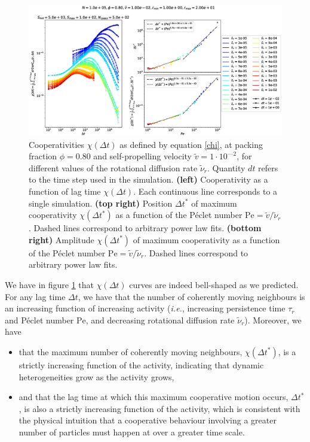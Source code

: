 \documentclass[class=report, float=false, crop=false]{standalone}
\begin{document}
\begin{figure}[h!]
\centering
\includegraphics[width=\textwidth]{figures/figs/intCuu_dt_Dk8000_Vj1000_Nq1000_Io5000_Mn1000_Cn5000_RMINl1000_RMAXm2000.eps}
\caption{Cooperativities $\chi(\Delta t)$ as defined by equation \ref{chi}, at packing fraction $\phi = 0.80$ and self-propelling velocity $\tilde{v} = 1\cdot10^{—2}$, for different values of the rotational diffusion rate $\tilde{\nu}_r$. Quantity $dt$ refers to the time step used in the simulation. \textbf{(left)} Cooperativity as a function of lag time $\chi(\Delta t)$. Each continuous line corresponds to a single simulation. \textbf{(top right)} Position $\Delta t^*$ of maximum cooperativity $\chi(\Delta t^*)$ as a function of the P\'eclet number $\text{Pe} = \tilde{v}/\tilde{\nu}_r$. Dashed lines correspond to arbitrary power law fits. \textbf{(bottom right)} Amplitude $\chi(\Delta t^*)$ of maximum cooperativity as a function of the P\'eclet number $\text{Pe} = \tilde{v}/\tilde{\nu}_r$. Dashed lines correspond to arbitrary power law fits.}
\label{chi_dr_dt}
\end{figure}

We have in figure \ref{chi_dr_dt} that $\chi(\Delta t)$ curves are indeed bell-shaped as we predicted.\\

For any lag time $\Delta t$, we have that the number of coherently moving neighbours is an increasing function of increasing activity (\textit{i.e.}, increasing persistence time $\tau_r$ and P\'eclet number $\text{Pe}$, and decreasing rotational diffusion rate $\tilde{\nu}_r$). Moreover, we have
\begin{itemize}
  \item that the maximum number of coherently moving neighbours, $\chi(\Delta t^*)$, is a strictly increasing function of the activity, indicating that dynamic heterogeneities grow as the activity grows,
  \item and that the lag time at which this maximum cooperative motion occurs, $\Delta t^*$, is also a strictly increasing function of the activity, which is consistent with the physical intuition that a cooperative behaviour involving a greater number of particles must happen at over a greater time scale.\\
\end{itemize}
\end{document}
